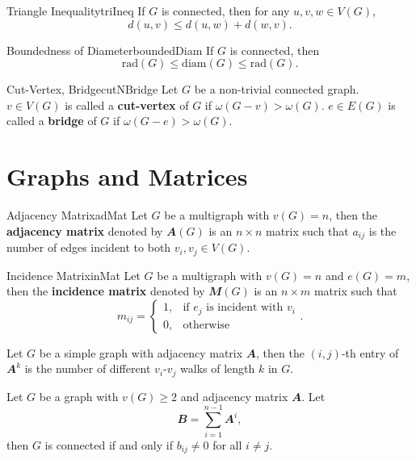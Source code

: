 \documentclass[math]{amznotes}
\theoremstyle{remark}
\begin{document}
\begin{thmbox}{Triangle Inequality}{triIneq}
    If $G$ is connected, then for any $u, v, w \in V(G)$,
    \begin{equation*}
        d(u, v) \leq d(u, w) + d(w, v).
    \end{equation*}
\end{thmbox}
\begin{thmbox}{Boundedness of Diameter}{boundedDiam}
    If $G$ is connected, then
    \begin{equation*}
        \mathrm{rad}(G) \leq \mathrm{diam}(G) \leq \mathrm{rad}(G).
    \end{equation*}
\end{thmbox}
\begin{dfnbox}{Cut-Vertex, Bridge}{cutNBridge}
    Let $G$ be a non-trivial connected graph. $v \in V(G)$ is called a {\color{red} \textbf{cut-vertex}} of $G$ if $\omega(G - v) > \omega(G)$. $e \in E(G)$ is called a {\color{red} \textbf{bridge}} of $G$ if $\omega(G - e) > \omega(G)$.
\end{dfnbox}

\section{Graphs and Matrices}
\begin{dfnbox}{Adjacency Matrix}{adMat}
    Let $G$ be a multigraph with $v(G) = n$, then the {\color{red} \textbf{adjacency matrix}} denoted by $\mathbfit{A}(G)$ is an $n \times n$ matrix such that $a_{ij}$ is the number of edges incident to both $v_i, v_j \in V(G)$.
\end{dfnbox}
\begin{dfnbox}{Incidence Matrix}{inMat}
    Let $G$ be a multigraph with $v(G) = n$ and $e(G) = m$, then the {\color{red} \textbf{incidence matrix}} denoted by $\mathbfit{M}(G)$ is an $n \times m$ matrix such that
    \begin{equation*}
        m_{ij} = \begin{cases}
            1, &\textrm{if } e_j \textrm{ is incident with } v_i \\
            0, &\textrm{otherwise}
        \end{cases}.
    \end{equation*}
\end{dfnbox}
\begin{probox}{}{}
    Let $G$ be a simple graph with adjacency matrix $\mathbfit{A}$, then the $(i, j)$-th entry of $\mathbfit{A}^k$ is the number of different $v_i$-$v_j$ walks of length $k$ in $G$.
\end{probox}
\begin{corbox}{}{}
    Let $G$ be a graph with $v(G) \geq 2$ and adjacency matrix $\mathbfit{A}$. Let
    \begin{equation*}
        \mathbfit{B} = \sum_{i = 1}^{n - 1}\mathbfit{A}^i,
    \end{equation*}
    then $G$ is connected if and only if $b_{ij} \neq 0$ for all $i \neq j$.
\end{corbox}
\end{document}
